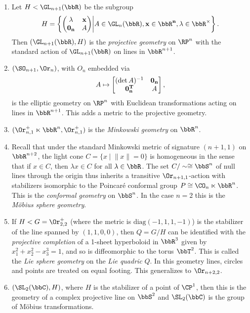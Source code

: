 \begin{example}
\begin{enumerate}
        \item Let $H<\GL_{n+1}(\bbR)$ be the subgroup
        \[H=\left\{\begin{pmatrix}
            \lambda& \bf{x}\\ \bf{0}_n &A
        \end{pmatrix}
        \middle| A\in\GL_n(\bbR),\bf{x}\in\bbR^n,\lambda\in \bbR^\times \right\}.\]
        Then $(\GL_{n+1}(\bbR),H)$ is the \emph{projective geometry} on $\RP^n$ with the standard action of $\GL_{n+1}(\bbR)$ on lines in $\bbR^{n+1}$.
        
        \item $(\SO_{n+1},\Or_n)$, with $O_n$ embedded via
        \[A\mapsto \begin{bmatrix}
            (\det A)^{-1}&\bf{0}_n\\\bf{0}_n^T &  A
        \end{bmatrix},\]
        is the elliptic geometry on $\RP^n$ with Euclidean transformations acting on lines in $\bbR^{n+1}$. This adds a metric to the projective geometry.

        \item $(\Or_{n,1}^+\ltimes\bbR^n,\Or_{n,1}^+)$ is the \emph{Minkowski geometry} on $\bbR^n$.

        \item Recall that under the standard Minkowski metric of signature $(n+1,1)$ on $\bbR^{n+2}$, the light cone $C=\{x\mid \lVert x\rVert=0\}$ is homogeneous in the sense that if $x\in C$, then $\lambda x\in C$ for all $\lambda\in\bbR$. The set $C\slash \sim\cong\bbS^n$ of null lines through the origin thus inherits a transitive $\Or_{n+1,1}$-action with stabilizers isomorphic to the Poincar\'e conformal group $P\cong \CO_n\ltimes \bbR^n$. This is the \emph{conformal geometry} on $\bbS^n$. In the case $n=2$ this is the \emph{M\"obius sphere geometry}.

        \item If $H<G=\Or_{2,2}^+$ (where the metric is $\mathrm{diag}(-1,1,1,-1)$) is the stabilizer of the line spanned by $(1,1,0,0)$, then $Q=G\slash H$ can be identified with the \emph{projective completion} of a 1-sheet hyperboloid in $\bbR^3$ given by $x_1^2+x_2^2-x_3^3=1$, and so is diffeomorphic to the torus $\bbT^2$. This is called the \emph{Lie sphere geometry} on the \emph{Lie quadric} $Q$. In this geometry lines, circles and points are treated on equal footing. This generalizes to $\Or_{n+2,2}$.

        \item $(\SL_2(\bbC),H)$, where $H$ is the stabilizer of a point of $\CP^1$, then this is the geometry of a complex projective line on $\bbS^2$ and $\SL_2(\bbC)$ is the group of M\"obius transformations.
    \end{enumerate}
\end{example}










